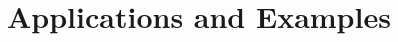 \documentclass[aspectratio=169]{beamer}
\begin{document}
\section{Applications and Examples}




    
\end{document}
